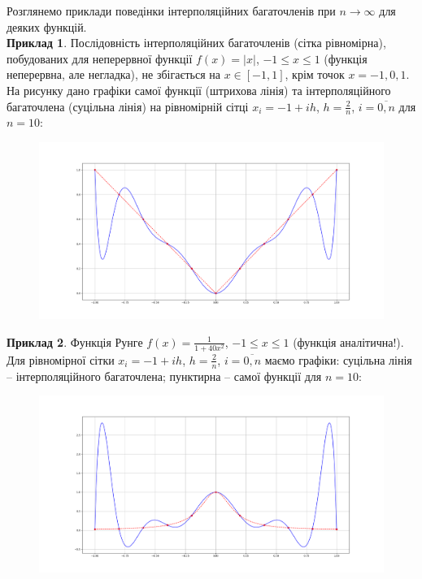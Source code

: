 Розглянемо приклади поведінки інтерполяційних багаточленів при $n\to\infty$ для деяких функцій. \\

\textbf{Приклад 1}. Послідовність інтерполяційних багаточленів (сітка рівномірна), побудованих для неперервної функції $f (x) = |x|$, $-1\le x\le1$ (функція неперервна, але негладка), не збігається на $x \in [-1,1]$, крім точок $x=-1,0,1$. \\

На рисунку дано графіки самої функції (штрихова лінія) та інтерполяційного багаточлена (суцільна лінія) на рівномірній сітці $x_i = -1 + i h$, $h = \frac2n$, $i=\overline{0,n}$ для $n = 10$:
\begin{figure}[H]
    \centering
    \includegraphics[width=\linewidth]{mal-4.png}
\end{figure}
\textbf{Приклад 2}. Функція Рунге $f(x) = \frac{1}{1+40x^2}$, $-1\le x\le1$ (функція аналітична!). Для рівномірної сітки $x_i = -1 + i h$, $h = \frac2n$, $i=\overline{0,n}$ маємо графіки: суцільна лінія -- інтерполяційного багаточлена; пунктирна -- самої функції для $n = 10$:
\begin{figure}[H]
    \centering
    \includegraphics[width=\linewidth]{mal-5.png}
\end{figure}
